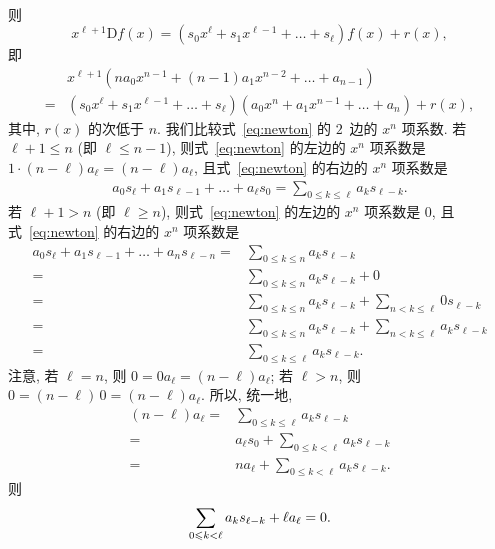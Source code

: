 \documentclass[../libro.tex]{subfiles}
\begin{document}
\begin{example}
\begin{align*}
    \end{align*}
    则
    \begin{equation}
        x^{\ell+1} \mathrm{D} f(x)
        = (s_0 x^\ell + s_1 x^{\ell-1} + \dots + s_\ell) f(x)
        + r(x),
        \label{eq:newton}
    \end{equation}
    即
    \begin{align*}
        &
        x^{\ell+1}
        (n a_0 x^{n-1} + (n-1) a_1 x^{n-2} + \dots + a_{n-1})
        \\
        = {} &
        (s_0 x^\ell + s_1 x^{\ell-1} + \dots + s_\ell)
        (a_0 x^n + a_1 x^{n-1} + \dots + a_n)
        + r(x),
    \end{align*}
    其中, \(r(x)\) 的次低于 \(n\).
    我们比较式~\eqref{eq:newton} 的 \(2\)~边的 \(x^n\) 项系数.
    若 \(\ell + 1 \leq n\) (即 \(\ell \leq n - 1\)),
    则式~\eqref{eq:newton} 的左边的 \(x^n\) 项系数是
    \(1 \cdot (n - \ell) a_\ell = (n - \ell) a_\ell\),
    且式~\eqref{eq:newton} 的右边的 \(x^n\) 项系数是
    \begin{align*}
        a_0 s_\ell + a_1 s_{\ell-1} + \dots + a_\ell s_0
        = \sum_{0 \leq k \leq \ell} {a_k s_{\ell-k}}.
    \end{align*}
    若 \(\ell + 1 > n\) (即 \(\ell \geq n\)),
    则式~\eqref{eq:newton} 的左边的 \(x^n\) 项系数是 \(0\),
    且式~\eqref{eq:newton} 的右边的 \(x^n\) 项系数是
    \begin{align*}
        a_0 s_\ell + a_1 s_{\ell-1} + \dots + a_n s_{\ell-n}
        = {} &
        \sum_{0 \leq k \leq n} {a_k s_{\ell-k}}
        \\
        = {} &
        \sum_{0 \leq k \leq n} {a_k s_{\ell-k}}
        + 0
        \\
        = {} &
        \sum_{0 \leq k \leq n} {a_k s_{\ell-k}}
        + \sum_{n < k \leq \ell} {0 s_{\ell-k}}
        \\
        = {} &
        \sum_{0 \leq k \leq n} {a_k s_{\ell-k}}
        + \sum_{n < k \leq \ell} {a_k s_{\ell-k}}
        \\
        = {} &
        \sum_{0 \leq k \leq \ell} {a_k s_{\ell-k}}.
    \end{align*}
    注意, 若 \(\ell = n\), 则
    \(0 = 0 a_\ell = (n - \ell) a_\ell\);
    若 \(\ell > n\), 则
    \(0 = (n - \ell)\, 0 = (n - \ell) a_\ell\).
    所以, 统一地,
    \begin{align*}
        (n - \ell) a_\ell
        = {} &
        \sum_{0 \leq k \leq \ell} {a_k s_{\ell-k}}
        \\
        = {} &
        a_\ell s_0
        + \sum_{0 \leq k < \ell} {a_k s_{\ell-k}}
        \\
        = {} &
        n a_\ell
        + \sum_{0 \leq k < \ell} {a_k s_{\ell-k}}.
    \end{align*}
    则
    \begin{equation*}
        \sum_{0 \leqslant k < \ell} {a_k s_{\ell-k}}
        + \ell a_\ell = 0.
        \qedhere
    \end{equation*}
\end{example}
\end{document}
